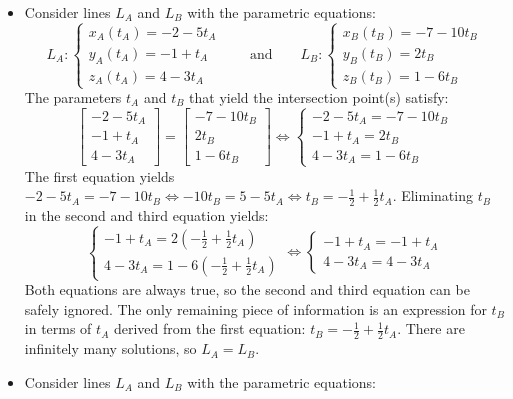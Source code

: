 \documentclass{article}
\begin{document}
\begin{itemize}
\item Consider lines \(L_A\) and \(L_B\) with the parametric equations:
\[L_A : \left\{\begin{array}{l}
x_A(t_A) = -2 - 5t_A \\ 
y_A(t_A) = -1 + t_A \\ 
z_A(t_A) = 4 - 3t_A
\end{array}\right.
\quad\quad\text{and}\quad\quad 
L_B : \left\{\begin{array}{l}
x_B(t_B) = -7 - 10t_B \\ 
y_B(t_B) = 2t_B \\ 
z_B(t_B) = 1 - 6t_B 
\end{array}\right.\]
The parameters \(t_A\) and \(t_B\) that yield the intersection point(s) satisfy:
\[\begin{bmatrix}
-2 - 5t_A \\ 
-1 + t_A \\ 
4 - 3t_A 
\end{bmatrix} = \begin{bmatrix} 
-7 - 10t_B \\ 
2t_B \\ 
1 - 6t_B
\end{bmatrix} \iff 
\left\{\begin{array}{l}
-2 - 5t_A = -7 - 10t_B \\ 
-1 + t_A = 2t_B \\ 
4 - 3t_A = 1 - 6t_B
\end{array}\right.\]
The first equation yields \(-2 - 5t_A = -7 - 10t_B \iff -10t_B = 5 - 5t_A \iff t_B = -\frac{1}{2} + \frac{1}{2}t_A\). Eliminating \(t_B\) in the second and third equation yields:
\[\left\{\begin{array}{l}
-1 + t_A = 2(-\frac{1}{2} + \frac{1}{2}t_A) \\ 
4 - 3t_A = 1 - 6(-\frac{1}{2} + \frac{1}{2}t_A)
\end{array}\right. \iff \left\{\begin{array}{l}
-1 + t_A = -1 + t_A \\ 
4 - 3t_A = 4 - 3t_A 
\end{array}\right.\]
Both equations are always true, so the second and third equation can be safely ignored. The only remaining piece of information is an expression for \(t_B\) in terms of \(t_A\) derived from the first equation: \(t_B = -\frac{1}{2} + \frac{1}{2}t_A\). There are infinitely many solutions, so \(L_A = L_B\).
\item Consider lines \(L_A\) and \(L_B\) with the parametric equations:

\end{itemize}
\end{document}
